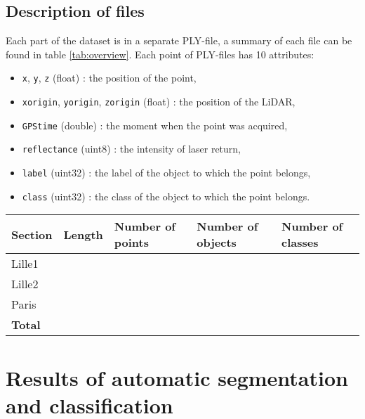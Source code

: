 \documentclass[a4paper, 10pt, journal]{article}
\begin{document}
\subsection{Description of files} \label{subsec:summary}

Each part of the dataset is in a separate PLY-file, a summary of each file can be found in table \ref{tab:overview}. Each point of PLY-files has 10 attributes:
\begin{itemize}
 \item \texttt{x}, \texttt{y}, \texttt{z} (float) : the position of the point,
 \item \texttt{xorigin}, \texttt{yorigin}, \texttt{zorigin} (float) : the position of the LiDAR,
 \item \texttt{GPStime} (double) : the moment when the point was acquired,
 \item \texttt{reflectance} (uint8) : the intensity of laser return,
 \item \texttt{label} (uint32) : the label of the object to which the point belongs,
 \item \texttt{class} (uint32) : the class of the object to which the point belongs.
\end{itemize}

\begin{center}\centering
 \begin{tabular}{C{1.0cm}C{1.0cm}C{1.4cm}C{1.5cm}C{1.4cm}}
  \toprule
   \textbf{Section} & \textbf{Length} & \textbf{Number of points} & \textbf{Number of objects} & \textbf{Number of classes} \\\midrule
   Lille1 &  &  &  &  \\
   Lille2 &  &  &  &  \\
   Paris &  &  &  &  \\\midrule
   \textbf{Total} &  &  &  &  \\
  \bottomrule 
 \end{tabular}
\end{center}

\section{Results of automatic segmentation and classification} \label{sec:ourResults}
\end{document}
